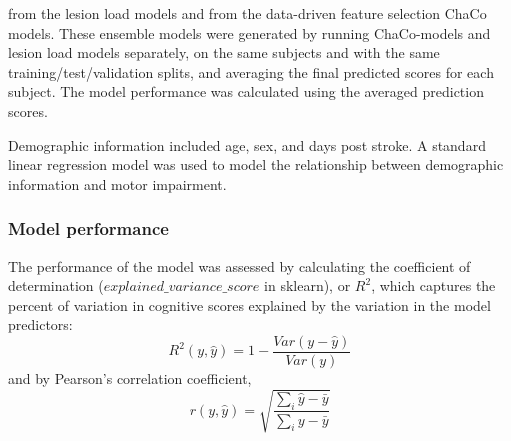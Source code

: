\documentclass[10pt]{article}
\begin{document}
from the lesion load models and from the data-driven feature selection ChaCo models. These ensemble models were generated by running ChaCo-models and lesion load models separately, on the same subjects and with the same training/test/validation splits, and averaging the final predicted scores for each subject. The model performance was calculated using the averaged prediction scores.

Demographic information included age, sex, and days post stroke. A standard linear regression model was used to model the relationship between demographic information and motor impairment. 


\subsubsection{Model performance}
The performance of the model was assessed by calculating the coefficient of determination ($explained\_variance\_score$ in sklearn), or $R^2$, which captures the percent of variation in cognitive scores explained by the variation in the model predictors:
\begin{equation}
    R^2(y, \hat{y}) = 1 - \frac{Var(y-\hat{y})}{Var(y)}
\end{equation}
and by Pearson's correlation coefficient, 
\begin{equation}
    r(y, \hat{y}) = \sqrt{\frac{\sum_i{\hat{y}-\bar{y}}}{\sum_i{y-\bar{y}}}}
\end{equation}
\end{document}
